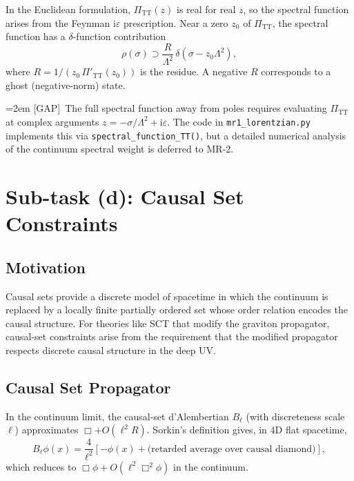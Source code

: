 \documentclass[11pt,a4paper]{article}
\theoremstyle{definition}
\theoremstyle{remark}
\newcommand{\ii}{\mathrm{i}}
\newcommand{\gap}{\textcolor{red!80!black}{\textsf{[GAP]}}}
\begin{document}
In the Euclidean formulation, $\Pi_{\mathrm{TT}}(z)$ is real for real
$z$, so the spectral function arises from the Feynman $\ii\varepsilon$
prescription.  Near a zero $z_0$ of $\Pi_{\mathrm{TT}}$, the spectral
function has a $\delta$-function contribution
\begin{equation}
  \rho(\sigma) \supset \frac{R}{\Lambda^2}\,\delta(\sigma - z_0\Lambda^2),
\end{equation}
where $R = 1/(z_0\,\Pi'_{\mathrm{TT}}(z_0))$ is the residue.  A
negative $R$ corresponds to a ghost (negative-norm) state.

{\emergencystretch=2em
\gap\ The full spectral function away from poles requires evaluating
$\Pi_{\mathrm{TT}}$ at complex arguments
$z = -\sigma/\Lambda^2 + \ii\varepsilon$.
The code in \texttt{mr1\_lorentzian.py} implements this via
\texttt{spectral\_function\_TT()}, but a detailed numerical analysis
of the continuum spectral weight is deferred to MR-2.\par}


\section{Sub-task (d): Causal Set Constraints}
\label{sec:causal}

\subsection{Motivation}

Causal sets provide a discrete model of spacetime in which the
continuum is replaced by a locally finite partially ordered set
whose order relation encodes the causal structure.  For theories like
SCT that modify the graviton propagator, causal-set constraints
arise from the requirement that the modified propagator respects
discrete causal structure in the deep UV.

\subsection{Causal Set Propagator}

In the continuum limit, the causal-set d'Alembertian $B_\ell$ (with
discreteness scale $\ell$) approximates $\Box + O(\ell^2 R)$.
Sorkin's definition gives, in 4D flat spacetime,
\begin{equation}
  B_\ell \phi(x) = \frac{4}{\ell^2}\left[
    -\phi(x) + \text{(retarded average over causal diamond)}
  \right],
\end{equation}
which reduces to $\Box\phi + O(\ell^2\Box^2\phi)$ in the continuum.
\end{document}

